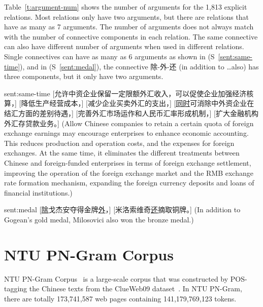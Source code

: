 

Table~\ref{t:argument-num} shows the number of arguments for the 1,813 explicit
relations. Most relations only have two arguments, but there are relations
that have as many as 7 arguments. The number of arguments does not always
match with the number of connective components in each relation. The same
connective can also have different number of arguments when used in
different relations. Single connectives can have as many as 6 arguments
as shown in (S~\ref{sent:same-time}), and in (S~\ref{sent:medal}),
the connective 除-外-还 (in addition to \ldots also)
has three components, but it only have two arguments.



\begin{sent}{sent:same-time}{}
    [允许中资企业保留一定限额外汇收入，可以促使企业加强经济核算，]
    [降低生产经营成本，]
    [减少企业买卖外汇的支出，]
    [\underline{同时}可消除中外资企业在结汇方面的差别待遇，]
    [完善外汇市场运作和人民币汇率形成机制，]
    [扩大金融机构外汇存贷款业务。]
    (Allow Chinese companies to retain a certain quota of foreign exchange earnings
     may encourage enterprises to enhance economic accounting.
     This reduces production and operation costs, and the expenses for foreign
     exchanges.  At the same time, it eliminates the different treatments between
     Chinese and foreign-funded enterprises in terms of foreign exchange settlement,
     improving the operation of the foreign exchange market and the RMB
     exchange rate formation mechanism, expanding the foreign currency deposits and
     loans of financial institutions.)
\end{sent}

\begin{sent}{sent:medal}{}
    [\underline{除}戈杰安夺得金牌\underline{外}，]
    [米洛索维奇\underline{还}摘取铜牌。]
    (In addition to Gogean's gold medal, Milosovici also won the bronze medal.)
\end{sent}

\section{NTU PN-Gram Corpus}

NTU PN-Gram Corpus~\citep{yu2012development} is a large-scale corpus that was
constructed by POS-tagging the Chinese texts from the ClueWeb09
dataset~\citep{callan2009clueweb09}. In NTU PN-Gram, there are totally 173,741,587
web pages containing 141,179,769,123 tokens.

